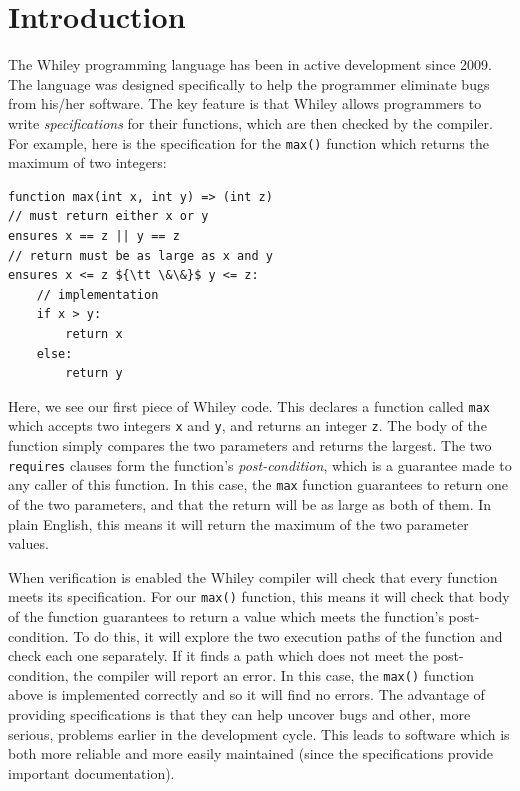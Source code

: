 \section{Introduction}
The Whiley programming language has been in active development since
2009.  The language was designed specifically to help the programmer
eliminate bugs from his/her software.  The key feature is that Whiley
allows programmers to write {\em specifications} for their functions,
which are then checked by the compiler.  For example, here is the
specification for the \lstinline{max()} function which returns the
maximum of two integers:

\begin{lstlisting}
function max(int x, int y) => (int z)
// must return either x or y
ensures x == z || y == z
// return must be as large as x and y
ensures x <= z ${\tt \&\&}$ y <= z:
    // implementation
    if x > y:
        return x
    else:
        return y
\end{lstlisting}
Here, we see our first piece of Whiley code.  This declares a function
called \lstinline{max} which accepts two integers \lstinline{x} and
\lstinline{y}, and returns an integer \lstinline{z}.  The body of the
function simply compares the two parameters and returns the largest.
The two \lstinline{requires} clauses form the function's {\em
  post-condition}, which is a guarantee made to any caller of this
function.  In this case, the \lstinline{max} function guarantees to
return one of the two parameters, and that the return will be as large
as both of them.  In plain English, this means it will return the
maximum of the two parameter values.

When verification is enabled the Whiley compiler will check that every
function meets its specification.  For our \lstinline{max()} function,
this means it will check that body of the function guarantees to
return a value which meets the function's post-condition.  To do this,
it will explore the two execution paths of the function and check each
one separately.  If it finds a path which does not meet the
post-condition, the compiler will report an error.  In this case, the
\lstinline{max()} function above is implemented correctly and so it
will find no errors.  The advantage of providing specifications is
that they can help uncover bugs and other, more serious, problems
earlier in the development cycle.  This leads to software which is
both more reliable and more easily maintained (since the
specifications provide important documentation).

